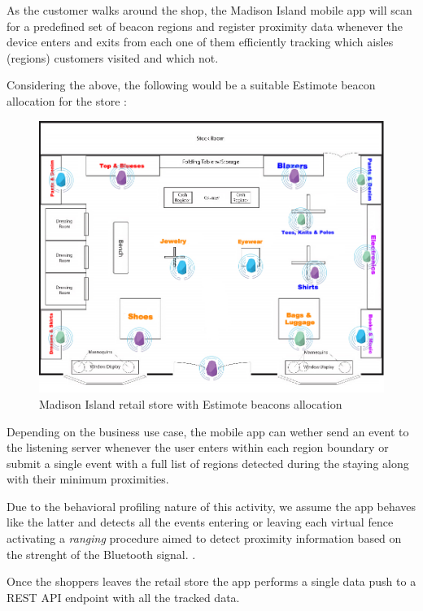 As the customer walks around the shop, the Madison Island mobile app will scan for a predefined set of beacon regions and register proximity data whenever the device enters and exits from each one of them efficiently tracking which aisles (regions) customers visited and which not. 

Considering the above, the following would be a suitable Estimote beacon allocation for the store :

\vspace{0.5cm}
\begin{figure}[H]
  \centering
    \includegraphics[width=16cm]{images/madison/retail-map-beacon.jpg}
  \caption{Madison Island retail store with Estimote beacons allocation}
  \label{fig:beacons-map}
\end{figure}
\vspace{0.5cm}

Depending on the business use case, the mobile app can wether send an event to the listening server whenever the user enters within each region boundary or submit a single event with a full list of regions detected during the staying along with their minimum proximities. 

Due to the behavioral profiling nature of this activity, we assume the app behaves like the latter and detects all the events entering or leaving each virtual fence activating a \textit{ranging} procedure aimed to detect proximity information based on the strenght of the Bluetooth signal. \cite{region-monitoring-apple}.

Once the shoppers leaves the retail store the app performs a single data push to a REST API endpoint with all the tracked data.

